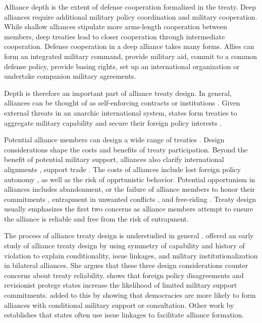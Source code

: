 \documentclass[12pt]{article}
\begin{document}
Alliance depth is the extent of defense cooperation formalized in the treaty. 
Deep alliances require additional military policy coordination and military cooperation. 
While shallow alliances stipulate more arms-length cooperation between members, deep treaties lead to closer cooperation through intermediate cooperation. 
Defense cooperation in a deep alliance takes many forms. 
Allies can form an integrated military command, provide military aid, commit to a common defense policy, provide basing rights, set up an international organization or undertake companion military agreements. 


Depth is therefore an important part of alliance treaty design. 
In general, alliances can be thought of as self-enforcing contracts or institutions \citep{Leedsetal2002, Morrow2000}.
Given external threats in an anarchic international system, states form treaties to aggregate military capability and secure their foreign policy interests \citep{Altfield1984, Smith1995, Snyder1997, FordhamPoast2014}. 


Potential alliance members can design a wide range of treaties \citep{Leedsetal2000, Leedsetal2002, Benson2012, BensonClinton2016}. 
Design considerations shape the costs and benefits of treaty participation. 
Beyond the benefit of potential military support, alliances also clarify international alignments \citep{Snyder1990}, support trade \citep{Gowa1995, Long2003, Fordham2010, WolfordKim2017}. 
The costs of alliances include lost foreign policy autonomy \citep{Altfield1984, Morrow2000, Johnson2015}, as well as the risk of opprtunistic behavior. 
Potential opportunism in alliances includes abandonment, or the failure of alliance members to honor their commitments \citep{BerkemeierFuhrmann2018}, entrapment in unwanted conflicts \citep{Snyder1984}, and free-riding \citep{Morrow2000}.  
Treaty design usually emphasizes the first two concerns as alliance members attempt to ensure the alliance is reliable and free from the risk of entrapment. 


The process of alliance treaty design is understudied in general \citep{Poast2019a}. 
\citet{Mattes2012} offered an early study of alliance treaty design by using symmetry of capability and history of violation to explain conditionality, issue linkages, and military institutionalization in bilateral alliances. 
She argues that these three design considerations counter concerns about treaty reliability. 
\citet{Benson2012} shows that foreign policy disagreements and revisionist protege states increase the likelihood of limited military support commitments. 
\citep{Chibaetal2015} added to this by showing that democracies are more likely to form alliances with conditional military support or consultation. 
Other work by \citet{Poast2012, Poast2013} establishes that states often use issue linkages to facilitate alliance formation. 
\end{document}

